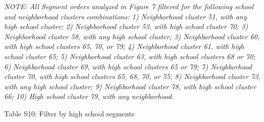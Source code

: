 \documentclass[
  12pt,
]{article}
\begin{document}
\emph{NOTE: All Segment orders analyzed in Figure 7 filtered for the following school and neighborhood clusters combinations: 1) Neighborhood cluster 51, with any high school cluster; 2) Neighborhood cluster 53, with high school cluster 70; 3) Neighborhood cluster 58, with any high school cluster; 3) Neighborhood cluster 60, with high school clusters 65, 70, or 79; 4) Neighborhood cluster 61, with high school cluster 65; 5) Neighborhood cluster 63, with high school clusters 68 or 70; 6) Neighborhood cluster 69, with high school clusters 65 or 79; 7) Neighborhood cluster 70, with high school clusters 65, 68, 70, or 75; 8) Neighborhood cluster 73, with any high school cluster; 9) Neighborhood cluster 78, with high school cluster 66; 10) High school cluster 79, with any neighborhood.}
\endgroup

\pagebreak

Table S10: Filter by high school segments \newline
\end{document}
